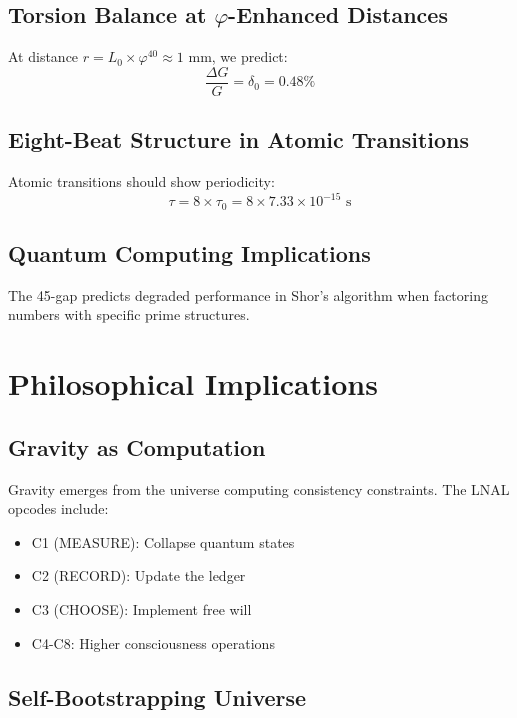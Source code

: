 \documentclass[12pt,a4paper]{article}
\begin{document}
\subsection{Torsion Balance at $\varphi$-Enhanced Distances}

At distance $r = L_0 \times \varphi^{40} \approx 1$ mm, we predict:
\begin{equation}
\frac{\Delta G}{G} = \delta_0 = 0.48\%
\end{equation}

\subsection{Eight-Beat Structure in Atomic Transitions}

Atomic transitions should show periodicity:
\begin{equation}
\tau = 8 \times \tau_0 = 8 \times 7.33 \times 10^{-15} \text{ s}
\end{equation}

\subsection{Quantum Computing Implications}

The 45-gap predicts degraded performance in Shor's algorithm when factoring numbers with specific prime structures.

\section{Philosophical Implications}

\subsection{Gravity as Computation}

Gravity emerges from the universe computing consistency constraints. The LNAL opcodes include:
\begin{itemize}
\item C1 (MEASURE): Collapse quantum states
\item C2 (RECORD): Update the ledger
\item C3 (CHOOSE): Implement free will
\item C4-C8: Higher consciousness operations
\end{itemize}

\subsection{Self-Bootstrapping Universe}
\end{document}
